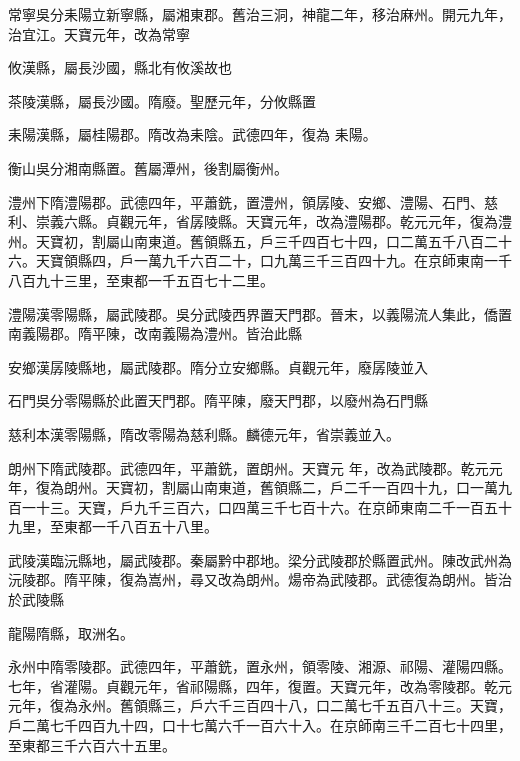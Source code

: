 \begin{pinyinscope}
 常寧吳分耒陽立新寧縣，屬湘東郡。舊治三洞，神龍二年，移治麻州。開元九年，治宜江。天寶元年，改為常寧



 攸漢縣，屬長沙國，縣北有攸溪故也



 茶陵漢縣，屬長沙國。隋廢。聖歷元年，分攸縣置



 耒陽漢縣，屬桂陽郡。隋改為耒陰。武德四年，復為
 耒陽。



 衡山吳分湘南縣置。舊屬潭州，後割屬衡州。



 澧州下隋澧陽郡。武德四年，平蕭銑，置澧州，領孱陵、安鄉、澧陽、石門、慈利、崇義六縣。貞觀元年，省孱陵縣。天寶元年，改為澧陽郡。乾元元年，復為澧州。天寶初，割屬山南東道。舊領縣五，戶三千四百七十四，口二萬五千八百二十六。天寶領縣四，戶一萬九千六百二十，口九萬三千三百四十九。在京師東南一千八百九十三里，至東都一千五百七十二里。



 澧陽漢零陽縣，屬武陵郡。吳分武陵西界置天門郡。晉末，以義陽流人集此，僑置南義陽郡。隋平陳，改南義陽為澧州。皆治此縣



 安鄉漢孱陵縣地，屬武陵郡。隋分立安鄉縣。貞觀元年，廢孱陵並入



 石門吳分零陽縣於此置天門郡。隋平陳，廢天門郡，以廢州為石門縣



 慈利本漢零陽縣，隋改零陽為慈利縣。麟德元年，省崇義並入。



 朗州下隋武陵郡。武德四年，平蕭銑，置朗州。天寶元
 年，改為武陵郡。乾元元年，復為朗州。天寶初，割屬山南東道，舊領縣二，戶二千一百四十九，口一萬九百一十三。天寶，戶九千三百六，口四萬三千七百十六。在京師東南二千一百五十九里，至東都一千八百五十八里。



 武陵漢臨沅縣地，屬武陵郡。秦屬黔中郡地。梁分武陵郡於縣置武州。陳改武州為沅陵郡。隋平陳，復為嵩州，尋又改為朗州。煬帝為武陵郡。武德復為朗州。皆治於武陵縣



 龍陽隋縣，取洲名。



 永州中隋零陵郡。武德四年，平蕭銑，置永州，領零陵、湘源、祁陽、灌陽四縣。七年，省灌陽。貞觀元年，省祁陽縣，四年，復置。天寶元年，改為零陵郡。乾元元年，復為永州。舊領縣三，戶六千三百四十八，口二萬七千五百八十三。天寶，戶二萬七千四百九十四，口十七萬六千一百六十入。在京師南三千二百七十四里，至東都三千六百六十五里。




\end{pinyinscope}
